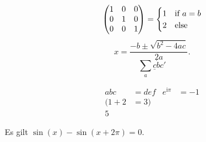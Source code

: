 \documentclass{article}
\begin{document}
\[
  \begin{pmatrix}
    1 & 0 & 0 \\
    0 & 1 & 0 \\
    0 & 0 & 1
  \end{pmatrix}
  =
  \begin{cases}
    1 & $if $a=b\\
    2 & $else$
  \end{cases}
\]
\ShowMathMLObj
\[
  x = \frac{-b \pm \sqrt{b^2-4ac}}{2a}.
\]
\[
  \sum_a\underline c\dot bc'
\]

\begin{align}
  abc&=def & e^{\mathrm{i}\pi}&=-1\\
  \Big(1+2&=3\Big)\\
  5
\end{align}

Es gilt $\sin(x)-\sin(x+2\pi)=0$.
\end{document}
